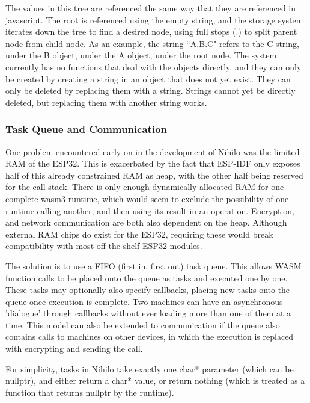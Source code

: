 \documentclass{article}
\begin{document}
The values in this tree are referenced the same way that they are referenced in javascript. The root is referenced using the empty string, and the storage system iterates down the tree to find a desired node, using full stops (.) to split parent node from child node. As an example, the string ``A.B.C" refers to the C string, under the B object, under the A object, under the root node. The system currently has no functions that deal with the objects directly, and they can only be created by creating a string in an object that does not yet exist. They can only be deleted by replacing them with a string. Strings cannot yet be directly deleted, but replacing them with another string works.

\subsubsection{Task Queue and Communication}

One problem encountered early on in the development of Nihilo was the limited RAM of the ESP32. This is exacerbated by the fact that ESP-IDF only exposes half of this already constrained RAM as heap, with the other half being reserved for the call stack. There is only enough dynamically allocated RAM for one complete wasm3 runtime, which would seem to exclude the possibility of one runtime calling another, and then using its result in an operation. Encryption, and network communication are both also dependent on the heap. Although external RAM chips do exist for the ESP32, requiring these would break compatibility with most off-the-shelf ESP32 modules.

The solution is to use a FIFO (first in, first out) task queue. This allows WASM function calls to be placed onto the queue as tasks and executed one by one. These tasks may optionally also specify callbacks, placing new tasks onto the queue once execution is complete. Two machines can have an asynchronous 'dialogue' through callbacks without ever loading more than one of them at a time. This model can also be extended to communication if the queue also contains calls to machines on other devices, in which the execution is replaced with encrypting and sending the call.

For simplicity, tasks in Nihilo take exactly one char* parameter (which can be nullptr), and either return a char* value, or return nothing (which is treated as a function that returns nullptr by the runtime).
\end{document}

